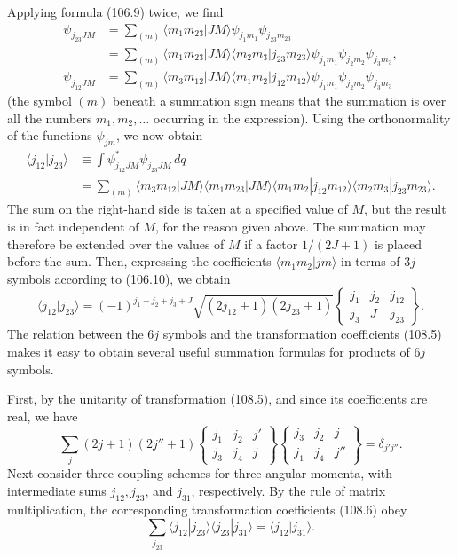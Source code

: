 Applying formula (106.9) twice, we find
\[
\begin{aligned}
\psi_{j_{23}JM}&=\sum_{(m)}\langle m_1m_{23}|JM\rangle\psi_{j_1m_1}\psi_{j_{23}m_{23}}\\
&=\sum_{(m)}\langle m_1m_{23}|JM\rangle\langle m_2m_3|j_{23}m_{23}\rangle
\psi_{j_1m_1}\psi_{j_2m_2}\psi_{j_3m_3},\\
\psi_{j_{12}JM}&=\sum_{(m)}\langle m_3m_{12}|JM\rangle\langle m_1m_2|j_{12}m_{12}\rangle
\psi_{j_1m_1}\psi_{j_2m_2}\psi_{j_3m_3}
\end{aligned}
\]
(the symbol $(m)$ beneath a summation sign means that the summation is over all the numbers $m_1,m_2,\ldots$ occurring in the expression). Using the orthonormality of the functions $\psi_{jm}$, we now obtain
\[
\begin{aligned}
\langle j_{12}|j_{23}\rangle&\equiv\int\psi_{j_{12}JM}^{*}\psi_{j_{23}JM}\,dq\\
&=\sum_{(m)}\langle m_3m_{12}|JM\rangle\langle m_1m_{23}|JM\rangle
\langle m_1m_2|j_{12}m_{12}\rangle\langle m_2m_3|j_{23}m_{23}\rangle.
\end{aligned}
\]
The sum on the right-hand side is taken at a specified value of $M$, but the result is in fact independent of $M$, for the reason given above. The summation may therefore be extended over the values of $M$ if a factor $1/(2J+1)$ is placed before the sum. Then, expressing the coefficients $\langle m_1m_2|jm\rangle$ in terms of $3j$ symbols according to (106.10), we obtain
\begin{equation}
\langle j_{12}|j_{23}\rangle=(-1)^{j_1+j_2+j_3+J}\sqrt{(2j_{12}+1)(2j_{23}+1)}
\left\{\begin{matrix}j_1&j_2&j_{12}\\j_3&J&j_{23}\end{matrix}\right\}.
\tag{108.6}
\end{equation}
The relation between the $6j$ symbols and the transformation coefficients (108.5) makes it easy to obtain several useful summation formulas for products of $6j$ symbols.

First, by the unitarity of transformation (108.5), and since its coefficients are real, we have
\begin{equation}
\sum_j(2j+1)(2j''+1)
\left\{\begin{matrix}j_1&j_2&j'\\j_3&j_4&j\end{matrix}\right\}
\left\{\begin{matrix}j_3&j_2&j\\j_1&j_4&j''\end{matrix}\right\}
=\delta_{j'j''}.
\tag{108.7}
\end{equation}
Next consider three coupling schemes for three angular momenta, with intermediate sums $j_{12},j_{23}$, and $j_{31}$, respectively. By the rule of matrix multiplication, the corresponding transformation coefficients (108.6) obey
\[
\sum_{j_{23}}\langle j_{12}|j_{23}\rangle\langle j_{23}|j_{31}\rangle=\langle j_{12}|j_{31}\rangle.
\]


